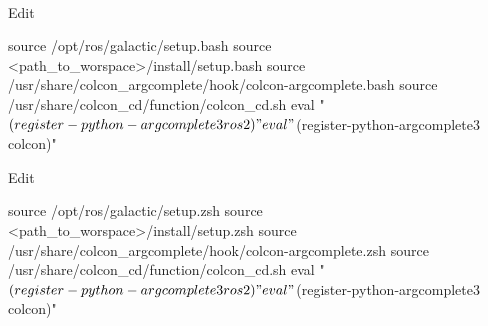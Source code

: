 \documentclass[usenames,11,dvipsnames,svgnames,x11names,aspectratio=1610,bibref]{beamer}
\newcommand{\mydisclaimer}{{\color{disclaimer}{\scriptsize ROS 2 -- Part I}}}
\renewcommand\sec{{\cnordSix{\secname}\hfill\mydisclaimer~} }
\begin{document}
\begin{frame}[fragile]{\sec}
\vspace*{\fill}
\begin{center} 


\begin{compactitem}
\item Edit 
    \begin{bashScriptListLine}
source /opt/ros/galactic/setup.bash
source <path_to_worspace>/install/setup.bash 
source /usr/share/colcon_argcomplete/hook/colcon-argcomplete.bash
source /usr/share/colcon_cd/function/colcon_cd.sh
eval "$(register-python-argcomplete3 ros2)"
eval "$(register-python-argcomplete3 colcon)"
    \end{bashScriptListLine}

\item Edit 
    \begin{bashScriptListLine}
source /opt/ros/galactic/setup.zsh
source <path_to_worspace>/install/setup.zsh 
source /usr/share/colcon_argcomplete/hook/colcon-argcomplete.zsh
source /usr/share/colcon_cd/function/colcon_cd.sh
eval "$(register-python-argcomplete3 ros2)"
eval "$(register-python-argcomplete3 colcon)"
    \end{bashScriptListLine}
    
\end{compactitem}

\end{center}
\vspace*{\fill}
\end{frame}


\end{document}
